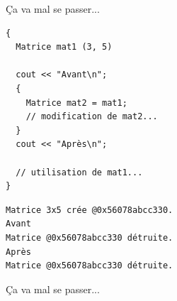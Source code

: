 \documentclass[c]{beamer}
\begin{document}


\begin{frame}[fragile]{Ça va mal se passer...}

\begin{verbatim}
{
  Matrice mat1 (3, 5)

  cout << "Avant\n";
  {
    Matrice mat2 = mat1;
    // modification de mat2...
  }
  cout << "Après\n";

  // utilisation de mat1...
}
\end{verbatim}

\pause

\begin{verbatim}
Matrice 3x5 crée @0x56078abcc330.
Avant
Matrice @0x56078abcc330 détruite.
Après
Matrice @0x56078abcc330 détruite.
\end{verbatim}

\end{frame}


\begin{frame}[fragile]{Ça va mal se passer...}
\end{frame}
\end{document}
